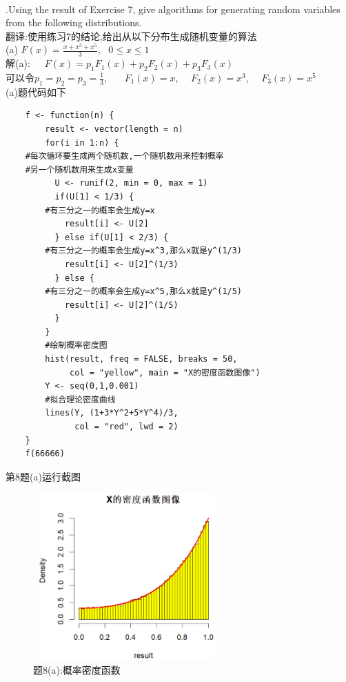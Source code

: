 \documentclass{book}
\begin{document}
\hspace*{\fill} \\

.Using the result of Exercise 7, give algorithms for generating random variables from
the following distributions. \\
翻译:使用练习7的结论,给出从以下分布生成随机变量的算法 \\
(a) $F(x) = \frac{x+x^3+x^5}{3}, \ \ \ 0 \leq x \leq 1$ \\
解(a):\ \ \ $F(x)=p_{1}F_{1}(x) + p_{2}F_{2}(x) + p_{3}F_{3}(x)$ \\
可以令$p_{1}=p_{2}=p_{3}=\frac{1}{3}$, \ \ \ $F_{1}(x)=x$, \ \ $F_{2}(x)=x^{3}$, \ \ $F_{3}(x)=x^{5}$  \\
(a)题代码如下
\lstset{language = R}
\begin{lstlisting}
    f <- function(n) {
        result <- vector(length = n)
        for(i in 1:n) {
    #每次循环要生成两个随机数,一个随机数用来控制概率
    #另一个随机数用来生成x变量
          U <- runif(2, min = 0, max = 1)
          if(U[1] < 1/3) {
        #有三分之一的概率会生成y=x
            result[i] <- U[2]
          } else if(U[1] < 2/3) {
        #有三分之一的概率会生成y=x^3,那么x就是y^(1/3)
            result[i] <- U[2]^(1/3)
          } else {
        #有三分之一的概率会生成y=x^5,那么x就是y^(1/5)
            result[i] <- U[2]^(1/5)
          }
        }
        #绘制概率密度图
        hist(result, freq = FALSE, breaks = 50,
             col = "yellow", main = "X的密度函数图像")
        Y <- seq(0,1,0.001)
        #拟合理论密度曲线
        lines(Y, (1+3*Y^2+5*Y^4)/3, 
              col = "red", lwd = 2)
    }
    f(66666)
\end{lstlisting}
第8题(a)运行截图
\begin{figure}[H]
  \centering
  \includegraphics*[height = 6.4cm, width = 7.2cm]{gramFile/第八题/(a)题概率密度函数图像.PNG}
  \caption{题8(a):概率密度函数}
\end{figure}
\end{document}
